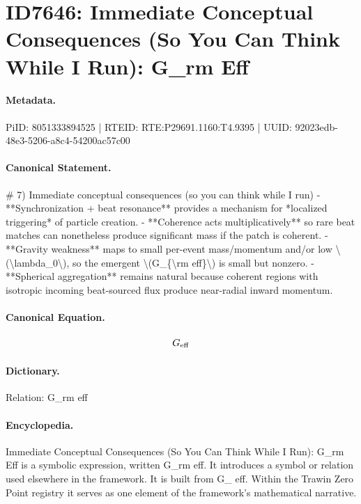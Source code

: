 \section*{ID7646: Immediate Conceptual Consequences (So You Can Think While I Run): G\_rm Eff}
\paragraph{Metadata.}
PiID: 8051333894525 | RTEID: RTE:P29691.1160:T4.9395 | UUID: 92023edb-48e3-5206-a8c4-54200ac57c00

\paragraph{Canonical Statement.}
\# 7) Immediate conceptual consequences (so you can think while I run) - **Synchronization + beat resonance** provides a mechanism for *localized triggering* of particle creation. - **Coherence acts multiplicatively** so rare beat matches can nonetheless produce significant mass if the patch is coherent. - **Gravity weakness** maps to small per-event mass/momentum and/or low \textbackslash{}(\textbackslash{}lambda\_0\textbackslash{}), so the emergent \textbackslash{}(G\_\{\textbackslash{}rm eff\}\textbackslash{}) is small but nonzero. - **Spherical aggregation** remains natural because coherent regions with isotropic incoming beat-sourced flux produce near-radial inward momentum.

\paragraph{Canonical Equation.}
\[
G_{\rm eff}
\]

\paragraph{Dictionary.}
Relation: G\_rm eff

\paragraph{Encyclopedia.}
Immediate Conceptual Consequences (So You Can Think While I Run): G\_rm Eff is a symbolic expression, written G\_rm eff. It introduces a symbol or relation used elsewhere in the framework. It is built from G\_ eff. Within the Trawin Zero Point registry it serves as one element of the framework's mathematical narrative.
